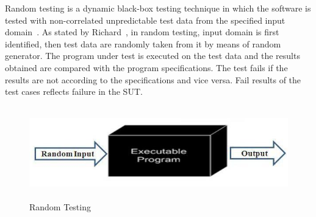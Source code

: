 Random testing is a dynamic black-box testing technique in which the software is tested with non-correlated unpredictable test data from the specified input domain~\cite{Chan2002}. As stated by Richard~\cite{hamlet1994}, in random testing, input domain is first identified, then test data are randomly taken from it by means of random generator. The program under test is executed on the test data and the results obtained are compared with the program specifications. The test fails if the results are not according to the specifications and vice versa. Fail results of the test cases reflects failure in the SUT.

\begin{figure}[h]
	\centering
	\includegraphics[width=13cm, height=4cm ]{chapter3/randomTesting.jpg}
	\caption{Random Testing}
\end{figure}

